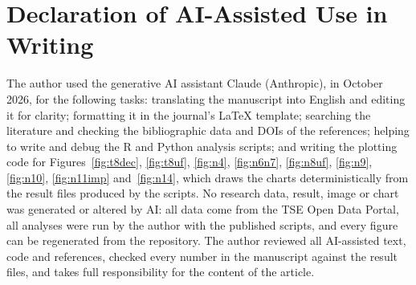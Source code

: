 \documentclass[fleqn,10pt]{SelfArx}
\begin{document}
\section*{Declaration of AI-Assisted Use in Writing}
The author used the generative AI assistant Claude (Anthropic), in October
2026, for the following tasks: translating the manuscript into English and
editing it for clarity; formatting it in the journal's \LaTeX{} template;
searching the literature and checking the bibliographic data and DOIs of the
references; helping to write and debug the R and Python analysis scripts;
and writing the plotting code for Figures~\ref{fig:t8dec}, \ref{fig:t8uf},
\ref{fig:n4}, \ref{fig:n6n7}, \ref{fig:n8uf}, \ref{fig:n9}, \ref{fig:n10},
\ref{fig:n11imp} and~\ref{fig:n14}, which draws the charts deterministically from the
result files produced by the scripts. No research data, result, image or
chart was generated or altered by AI: all data come from the TSE Open Data
Portal, all analyses were run by the author with the published scripts, and
every figure can be regenerated from the repository. The author reviewed
all AI-assisted text, code and references, checked every number in the
manuscript against the result files, and takes full responsibility for the
content of the article.

\makeatletter
\renewcommand\@biblabel[1]{{\parbox{0.7cm}{[#1]}}}
\makeatother
\renewcommand{\refname}{References}


\balance
\end{document}
